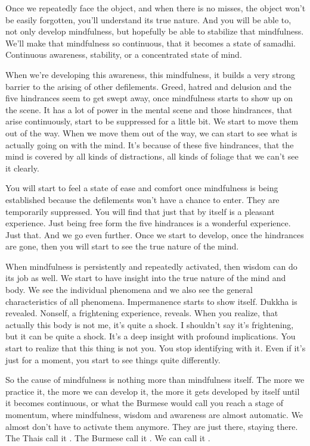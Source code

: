 \documentclass[letterpaper,10pt,english]{sphinxmanual}
\begin{document}
\sphinxAtStartPar
Once we repeatedly face the object, and when there is no misses, the
object won’t be easily forgotten, you’ll understand its true nature. And you
will be able to, not only develop mindfulness, but hopefully be able to stabilize that mindfulness. We’ll make that mindfulness so continuous, that it
becomes a state of samadhi. Continuous awareness, stability, or a concentrated state of mind.

\sphinxAtStartPar
When  we’re  developing  this  awareness,  this  mindfulness,  it  builds  a
very  strong  barrier  to  the  arising  of  other  defilements.  Greed,  hatred  and
delusion and the five hindrances seem to get swept away, once mindfulness
starts to show up on the scene. It has a lot of power in the mental scene and
those hindrances, that arise continuously, start to be suppressed for a little
bit. We start to move them out of the way. When we move them out of the
way, we can start to see what is actually going on with the mind. It’s because
of these five hindrances, that the mind is covered by all kinds of distractions,
all kinds of foliage that we can’t see it clearly.

\sphinxAtStartPar
You will start to feel a state of ease and comfort once mindfulness is
  being established because the defilements won’t have a chance to enter. They
are temporarily suppressed. You will find that just that by itself is a pleasant
experience. Just being free form the five hindrances is a wonderful experience. Just that. And we go even further. Once we start to develop, once the
hindrances are gone, then you will start to see the true nature of the mind.

\sphinxAtStartPar
When  mindfulness  is  persistently  and  repeatedly  activated,  then
wisdom can do its job as well. We start to have insight into the true nature
of  the  mind  and  body. We  see  the  individual  phenomena  and  we  also  see
the general characteristics of all phenomena. Impermanence starts to show
itself. Dukkha is revealed. Non\sphinxhyphen{}self, a frightening experience, reveals. When
you realize, that actually this body is not me, it’s quite a shock. I shouldn’t
say it’s frightening, but it can be quite a shock. It’s a deep insight with profound implications. You start to realize that this thing is not you. You stop
identifying with it. Even if it’s just for a moment, you start to see things quite
differently.

\sphinxAtStartPar
So the cause of mindfulness is nothing more than mindfulness itself.
The more we practice it, the more we can develop it, the more it gets developed by itself until it becomes continuous, or what the Burmese would call
you reach a stage of momentum, where mindfulness, wisdom and awareness
are almost automatic. We almost don’t have to activate them anymore. They
are just there, staying there. The Thais call it
. The Burmese call it
. We can call it
.
\end{document}
